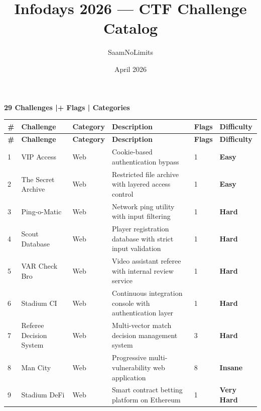 \documentclass[a4paper,10pt]{article}
\title{\Huge\bfseries Infodays 2026 --- CTF Challenge Catalog}
\author{SaamNoLimits}
\date{April 2026}
\newcommand{\easy}{\textbf{Easy}}
\newcommand{\hard}{\textbf{Hard}}
\newcommand{\vhard}{\textbf{Very Hard}}
\newcommand{\insane}{\textbf{Insane}}
\begin{document}
\maketitle
\thispagestyle{empty}

\vspace{0.5cm}
\noindent\textbf{29 Challenges \quad|+ Flags \quad| Categories}

\vspace{0.8cm}

\begin{longtable}{>{\raggedright}p{0.5cm} >{\raggedright}p{3.5cm} >{\raggedright}p{2.2cm} >{\raggedright}p{10cm} p{1.2cm} >{\raggedright\arraybackslash}p{1.8cm}}
\toprule
\textbf{\#} & \textbf{Challenge} & \textbf{Category} & \textbf{Description} & \textbf{Flags} & \textbf{Difficulty} \\
\midrule
\endfirsthead
\toprule
\textbf{\#} & \textbf{Challenge} & \textbf{Category} & \textbf{Description} & \textbf{Flags} & \textbf{Difficulty} \\
\midrule
\endhead
\bottomrule
\endfoot

1  & VIP Access              & Web        & Cookie-based authentication bypass                                                & 1 & \easy     \\
2  & The Secret Archive      & Web        & Restricted file archive with layered access control                               & 1 & \easy     \\
3  & Ping-o-Matic            & Web        & Network ping utility with input filtering                                         & 1 & \hard  \\
4  & Scout Database          & Web        & Player registration database with strict input validation                         & 1 & \hard     \\
5  & VAR Check Bro           & Web        & Video assistant referee with internal review service                              & 1 & \hard     \\
6  & Stadium CI              & Web        & Continuous integration console with authentication layer                         & 1 & \hard     \\
7  & Referee Decision System & Web        & Multi-vector match decision management system                                    & 3 & \hard     \\
8  & Man City                & Web        & Progressive multi-vulnerability web application                                   & 8 & \insane \\
9  & Stadium DeFi            & Web        & Smart contract betting platform on Ethereum                                      & 1 & \vhard    \\


\end{longtable}
\end{document}
